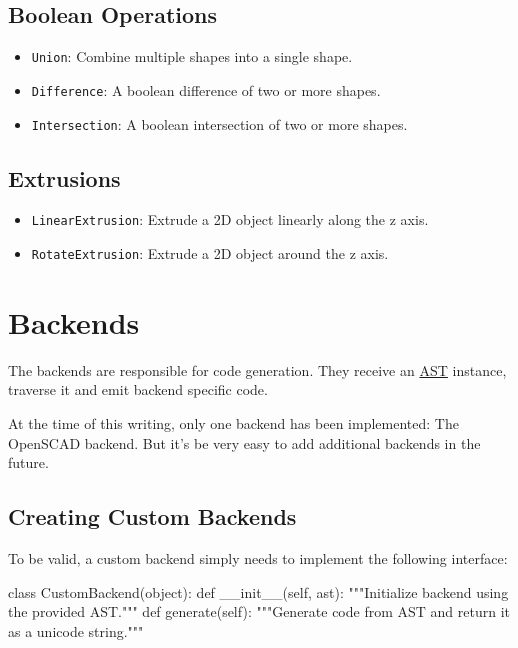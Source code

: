 \subsection{Boolean Operations}

\begin{itemize}
	\item \texttt{Union}: Combine multiple shapes into a single shape.
	\item \texttt{Difference}: A boolean difference of two or more shapes.
	\item \texttt{Intersection}: A boolean intersection of two or more shapes.
\end{itemize}

\subsection{Extrusions}

\begin{itemize}
	\item \texttt{LinearExtrusion}: Extrude a 2D object linearly along the z axis.
	\item \texttt{RotateExtrusion}: Extrude a 2D object around the z axis. 
\end{itemize}


\section{Backends}\label{sec:backends}

The backends are responsible for code generation. They receive an
\hyperref[sec:ast]{AST} instance, traverse it and emit backend specific code.

At the time of this writing, only one backend has been implemented: The OpenSCAD
backend. But it's be very easy to add additional backends in the future.

\subsection{Creating Custom Backends}

To be valid, a custom backend simply needs to implement the following interface:

\vspace{.5\baselineskip}
\begin{pythoncode}
class CustomBackend(object):
    def __init__(self, ast):
        """Initialize backend using the provided AST."""
    def generate(self):
        """Generate code from AST and return it
        as a unicode string."""
\end{pythoncode}


